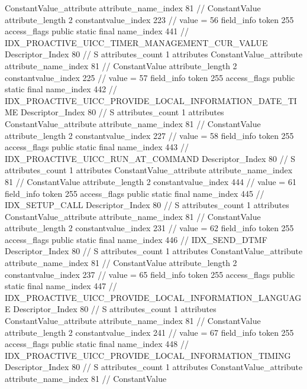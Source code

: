 {{{{{{				ConstantValue_attribute {
					attribute_name_index	81		// ConstantValue
					attribute_length	2
					constantvalue_index	223		// value = 56
				}
				}
			}
			field_info {
				token	255
				access_flags	public static final
				name_index	441		// IDX_PROACTIVE_UICC_TIMER_MANAGEMENT_CUR_VALUE
				Descriptor_Index	80		// S
				attributes_count	1
				attributes {
				ConstantValue_attribute {
					attribute_name_index	81		// ConstantValue
					attribute_length	2
					constantvalue_index	225		// value = 57
				}
				}
			}
			field_info {
				token	255
				access_flags	public static final
				name_index	442		// IDX_PROACTIVE_UICC_PROVIDE_LOCAL_INFORMATION_DATE_TIME
				Descriptor_Index	80		// S
				attributes_count	1
				attributes {
				ConstantValue_attribute {
					attribute_name_index	81		// ConstantValue
					attribute_length	2
					constantvalue_index	227		// value = 58
				}
				}
			}
			field_info {
				token	255
				access_flags	public static final
				name_index	443		// IDX_PROACTIVE_UICC_RUN_AT_COMMAND
				Descriptor_Index	80		// S
				attributes_count	1
				attributes {
				ConstantValue_attribute {
					attribute_name_index	81		// ConstantValue
					attribute_length	2
					constantvalue_index	444		// value = 61
				}
				}
			}
			field_info {
				token	255
				access_flags	public static final
				name_index	445		// IDX_SETUP_CALL
				Descriptor_Index	80		// S
				attributes_count	1
				attributes {
				ConstantValue_attribute {
					attribute_name_index	81		// ConstantValue
					attribute_length	2
					constantvalue_index	231		// value = 62
				}
				}
			}
			field_info {
				token	255
				access_flags	public static final
				name_index	446		// IDX_SEND_DTMF
				Descriptor_Index	80		// S
				attributes_count	1
				attributes {
				ConstantValue_attribute {
					attribute_name_index	81		// ConstantValue
					attribute_length	2
					constantvalue_index	237		// value = 65
				}
				}
			}
			field_info {
				token	255
				access_flags	public static final
				name_index	447		// IDX_PROACTIVE_UICC_PROVIDE_LOCAL_INFORMATION_LANGUAGE
				Descriptor_Index	80		// S
				attributes_count	1
				attributes {
				ConstantValue_attribute {
					attribute_name_index	81		// ConstantValue
					attribute_length	2
					constantvalue_index	241		// value = 67
				}
				}
			}
			field_info {
				token	255
				access_flags	public static final
				name_index	448		// IDX_PROACTIVE_UICC_PROVIDE_LOCAL_INFORMATION_TIMING
				Descriptor_Index	80		// S
				attributes_count	1
				attributes {
				ConstantValue_attribute {
					attribute_name_index	81		// ConstantValue
}}}}}}}
